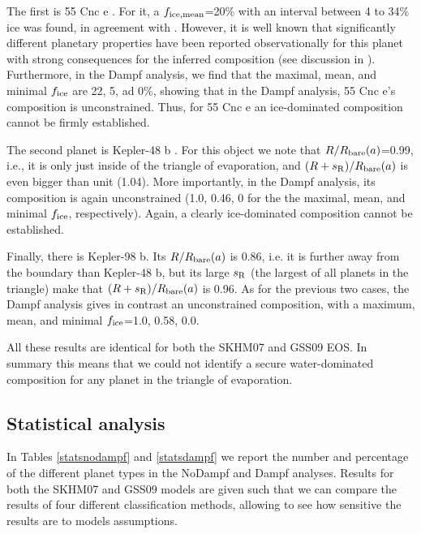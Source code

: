 \documentclass[]{emulateapj}
\begin{document}
The first is 55 Cnc e \citep{McArthur2004,Demory2011}. For it, a $f_{\rm ice,mean}$=20\% with an interval between 4 to 34\% ice was found, in agreement with \citet{Demory2011}. However, it is well known that significantly different planetary properties have been reported observationally for this planet with strong consequences for the inferred composition (see discussion in \citealt{Dorn2017b}). Furthermore, in the Dampf analysis, we find that the maximal, mean, and minimal  $f_{\rm ice}$ are 22, 5, ad 0\%, showing that in the Dampf analysis, 55 Cnc e's composition is unconstrained. Thus, for 55 Cnc e an ice-dominated composition cannot be firmly established. 

The second planet is Kepler-48 b \citep{Marcy2014}. For this object we note that $R/R_{\rm bare}(a)$=0.99, i.e., it is only just inside of the triangle of evaporation, and $(R+s_{\rm R})/R_{\rm bare}(a)$ is even bigger than unit (1.04). More importantly, in the Dampf analysis, its composition is again unconstrained (1.0, 0.46, 0 for the the maximal, mean, and minimal $f_{\rm ice}$, respectively). Again, a clearly ice-dominated composition cannot be established.

Finally, there is Kepler-98 b. Its $R/R_{\rm bare}(a)$ is 0.86, i.e. it is further away from the boundary than Kepler-48 b, but its large $s_{\rm R}$ (the largest of all planets in the triangle) make that $(R+s_{\rm R})/R_{\rm bare}(a)$ is 0.96.  As for the previous two cases, the Dampf analysis gives in contrast an unconstrained composition, with a maximum, mean, and  minimal $f_{\rm ice}$=1.0, 0.58, 0.0.

All these results are identical for both the SKHM07 and GSS09 EOS. In summary this means that we could not identify a secure water-dominated composition for any planet in the triangle of evaporation.

\subsection{Statistical analysis}
In Tables \ref{statsnodampf} and \ref{statsdampf} we report the number and percentage of the different planet types in the NoDampf and Dampf analyses. Results for both the SKHM07 and GSS09 models are given such that we can compare the results of four different classification methods, allowing to see how sensitive the results are to models assumptions. 
\end{document}
